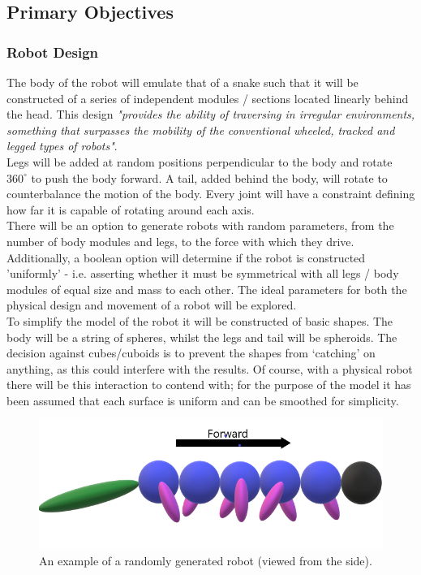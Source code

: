 \documentclass{article}
\begin{document}
\subsection{Primary Objectives}
\label{sec:Primary Objectives}
\subsubsection{Robot Design}
\label{sec:Robot Design}
The body of the robot will emulate that of a snake such that it will be constructed of a series of independent modules / sections located linearly behind the head. This design \textit{"provides the ability of traversing in irregular environments, something that surpasses the mobility of the conventional wheeled, tracked and legged types of robots"}. \\
Legs will be added at random positions perpendicular to the body and rotate $360^\circ$ to push the body forward. A tail, added behind the body, will rotate to counterbalance the motion of the body. Every joint will have a constraint defining how far it is capable of rotating around each axis. \\

There will be an option to generate robots with random parameters, from the number of body modules and legs, to the force with which they drive. Additionally, a boolean option will determine if the robot is constructed 'uniformly' - i.e. asserting whether it must be symmetrical with all legs / body modules of equal size and mass to each other. The ideal parameters for both the physical design and movement of a robot will be explored.\\

To simplify the model of the robot it will be constructed of basic shapes. The body will be a string of spheres, whilst the legs and tail will be spheroids. The decision against cubes/cuboids is to prevent the shapes from ‘catching’ on anything, as this could interfere with the results. Of course, with a physical robot there will be this interaction to contend with; for the purpose of the model it has been assumed that each surface is uniform and can be smoothed for simplicity. \\

\begin{figure}[H]
\centering
\includegraphics[scale=0.5]{robotDesign}
\caption{An example of a randomly generated robot (viewed from the side).}
\end{figure}
\end{document}
